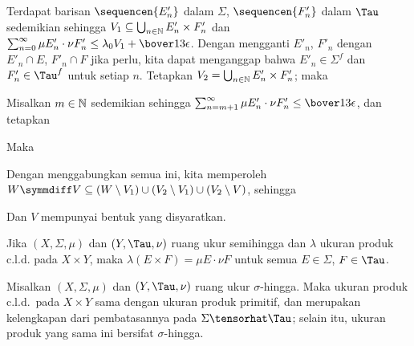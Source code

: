 {\noindent Terdapat
barisan $\sequencen{E'_n}$ dalam $\Sigma$, $\sequencen{F'_n}$ dalam
$\Tau$ sedemikian sehingga $V_1\subseteq\bigcup_{n\in\Bbb
N}E'_n\times F'_n$ dan $\sum_{n=0}^{\infty}\mu E'_n\cdot\nu
F'_n\le\lambda_0V_1+\bover13\epsilon$. Dengan mengganti $E'_n$, $F'_n$
dengan $E'_n\cap E$, $F'_n\cap F$ jika perlu, kita dapat menganggap bahwa
$E'_n\in\Sigma^f$ dan $F'_n\in\Tau^f$ untuk setiap $n$. Tetapkan
$V_2=\bigcup_{n\in\Bbb N}E'_n\times F'_n$; maka


\noindent Misalkan $m\in\Bbb N$ sedemikian sehingga
$\sum_{n=m+1}^{\infty}\mu E'_n\cdot\nu F'_n\le\bover13\epsilon$, dan
tetapkan


\noindent Maka


Dengan menggabungkan semua ini, kita memperoleh
$W\symmdiff V\subseteq(W\setminus V_1)\cup(V_2\setminus
V_1)\cup(V_2\setminus V)$, sehingga


\noindent Dan $V$ mempunyai bentuk yang disyaratkan.
}

 Jika $(X,\Sigma,\mu)$ dan $(Y,\Tau,\nu)$
ruang ukur semihingga dan $\lambda$ ukuran produk c.l.d. pada
$X\times Y$, maka $\lambda(E\times F)=\mu E\cdot\nu F$ untuk semua
$E\in\Sigma$, $F\in\Tau$.

 Misalkan $(X,\Sigma,\mu)$ dan $(Y,\Tau,\nu)$
ruang ukur $\sigma$-hingga. Maka ukuran produk c.l.d.\ pada
$X\times Y$ sama dengan ukuran produk primitif, dan merupakan
kelengkapan dari pembatasannya pada $\Sigma\tensorhat\Tau$; selain itu, ukuran
produk yang sama ini bersifat $\sigma$-hingga.

